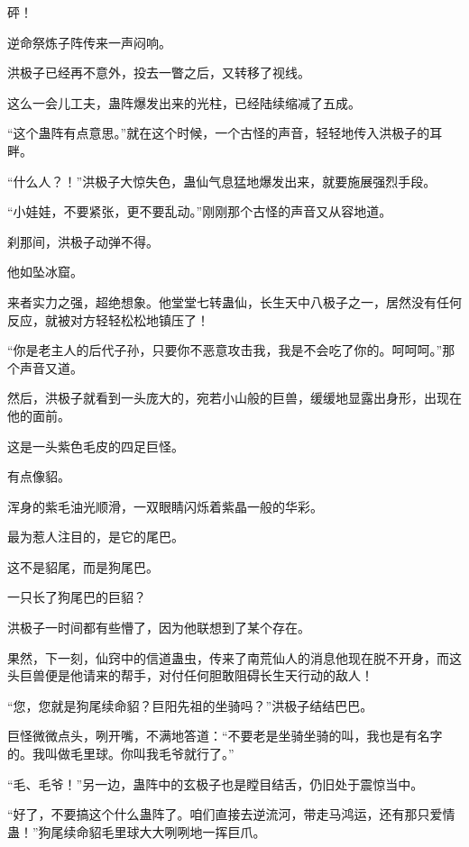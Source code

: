 
\begin{this_body}



砰！

逆命祭炼子阵传来一声闷响。

洪极子已经再不意外，投去一瞥之后，又转移了视线。

这么一会儿工夫，蛊阵爆发出来的光柱，已经陆续缩减了五成。

“这个蛊阵有点意思。”就在这个时候，一个古怪的声音，轻轻地传入洪极子的耳畔。

“什么人？！”洪极子大惊失色，蛊仙气息猛地爆发出来，就要施展强烈手段。

“小娃娃，不要紧张，更不要乱动。”刚刚那个古怪的声音又从容地道。

刹那间，洪极子动弹不得。

他如坠冰窟。

来者实力之强，超绝想象。他堂堂七转蛊仙，长生天中八极子之一，居然没有任何反应，就被对方轻轻松松地镇压了！

“你是老主人的后代子孙，只要你不恶意攻击我，我是不会吃了你的。呵呵呵。”那个声音又道。

然后，洪极子就看到一头庞大的，宛若小山般的巨兽，缓缓地显露出身形，出现在他的面前。

这是一头紫色毛皮的四足巨怪。

有点像貂。

浑身的紫毛油光顺滑，一双眼睛闪烁着紫晶一般的华彩。

最为惹人注目的，是它的尾巴。

这不是貂尾，而是狗尾巴。

一只长了狗尾巴的巨貂？

洪极子一时间都有些懵了，因为他联想到了某个存在。

果然，下一刻，仙窍中的信道蛊虫，传来了南荒仙人的消息他现在脱不开身，而这头巨兽便是他请来的帮手，对付任何胆敢阻碍长生天行动的敌人！

“您，您就是狗尾续命貂？巨阳先祖的坐骑吗？”洪极子结结巴巴。

巨怪微微点头，咧开嘴，不满地答道：“不要老是坐骑坐骑的叫，我也是有名字的。我叫做毛里球。你叫我毛爷就行了。”

“毛、毛爷！”另一边，蛊阵中的玄极子也是瞠目结舌，仍旧处于震惊当中。

“好了，不要搞这个什么蛊阵了。咱们直接去逆流河，带走马鸿运，还有那只爱情蛊！”狗尾续命貂毛里球大大咧咧地一挥巨爪。


\end{this_body}
